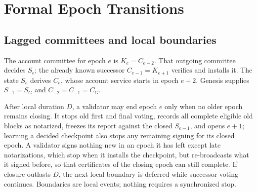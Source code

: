 \section{Formal Epoch Transitions}
\label{sec:transitions}
\subsection{Lagged committees and local boundaries}
\label{sec:lifecycle}
The account committee for epoch $e$ is $K_e=C_{e-2}$. That outgoing committee decides $S_e$; the already known successor $C_{e-1}=K_{e+1}$ verifies and installs it. The state $S_e$ derives $C_e$, whose account service starts in epoch $e+2$. Genesis supplies $S_{-1}=S_G$ and $C_{-2}=C_{-1}=C_G$.

After local duration $D$, a validator may end epoch $e$ only when no older epoch remains closing. It stops old first and final voting, records all complete eligible old blocks as notarized, freezes its report against the closed $S_{e-1}$, and opens $e+1$; learning a decided checkpoint also stops any remaining signing for its closed epoch. A validator signs nothing new in an epoch it has left except late notarizations, which stop when it installs the checkpoint, but re-broadcasts what it signed before, so that certificates of the closing epoch can still complete. If closure outlasts $D$, the next local boundary is deferred while successor voting continues. Boundaries are local events; nothing requires a synchronized stop.


